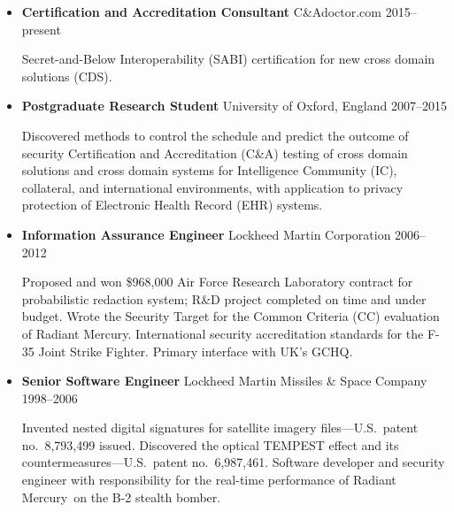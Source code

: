 \vspace{1mm}
\begin{itemize}
    \item \textbf{Certification and Accreditation Consultant} \hfill C\&Adoctor.com \hfill 2015--present
        \vspace{-2mm}
        \begin{myquote}
            Secret-and-Below Interoperability (SABI) certification for
            new cross domain solutions (CDS).
        \end{myquote}

    \vspace{-3mm}
	\item \textbf{Postgraduate Research Student} \hfill University of Oxford, England \hfill 2007--2015
        \vspace{-2mm}
		\begin{myquote}
            Discovered methods to control the schedule and predict the
            outcome of security Certification and Accreditation (C\&A)
            testing of cross domain solutions and cross domain systems for
            Intelligence Community (IC), collateral, and international
            environments, with application to privacy protection
            of Electronic Health Record (EHR) systems.
		\end{myquote}

    \vspace{-3mm}
	\item \textbf{Information Assurance Engineer} \hfill Lockheed Martin Corporation \hfill 2006--2012
		\vspace{-2mm}
		\begin{myquote}
            Proposed and won \$968,000 Air Force Research Laboratory
            contract for probabilistic redaction system; R\&D
            project completed on time and under budget. Wrote the
            Security Target for the Common Criteria (CC) evaluation of Radiant
            Mercury\rmtrademark. International security
            accreditation standards for the F-35 Joint Strike Fighter.
            Primary interface with UK's GCHQ.
		\end{myquote}

    \vspace{-3mm}
	\item \textbf{Senior Software Engineer} \hfill Lockheed Martin Missiles \& Space Company \hfill 1998--2006
		\vspace{-2mm}
		\begin{myquote}
            Invented nested digital signatures for satellite imagery
            files---U.S.\ patent no.~8,793,499 issued. Discovered the
            optical TEMPEST effect and its countermeasures---U.S.\ patent
            no.~6,987,461. Software developer and security engineer with
            responsibility for the real-time performance of Radiant
            Mercury\rmtrademark\ on the B-2 stealth bomber.
		\end{myquote}


\end{itemize}
